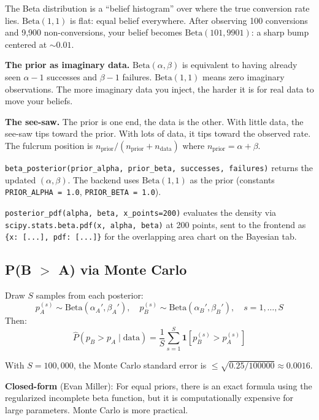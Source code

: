 \documentclass[11pt,a4paper]{article}
\newcommand{\code}[1]{\texttt{#1}}
\newcommand{\scipy}[1]{\texttt{scipy.stats.#1}}
\begin{document}
\vspace{8pt}

\begin{intuition}
The Beta distribution is a ``belief histogram'' over where the true conversion rate lies. $\mathrm{Beta}(1,1)$ is flat: equal belief everywhere. After observing 100 conversions and 9,900 non-conversions, your belief becomes $\mathrm{Beta}(101, 9901)$: a sharp bump centered at ${\sim}0.01$.

\medskip
\textbf{The prior as imaginary data.} $\mathrm{Beta}(\alpha, \beta)$ is equivalent to having already seen $\alpha - 1$ successes and $\beta - 1$ failures. $\mathrm{Beta}(1,1)$ means zero imaginary observations. The more imaginary data you inject, the harder it is for real data to move your beliefs.

\medskip
\textbf{The see-saw.} The prior is one end, the data is the other. With little data, the see-saw tips toward the prior. With lots of data, it tips toward the observed rate. The fulcrum position is $n_{\mathrm{prior}} / (n_{\mathrm{prior}} + n_{\mathrm{data}})$ where $n_{\mathrm{prior}} = \alpha + \beta$.
\end{intuition}

\vspace{8pt}

\begin{application}
\code{beta\_posterior(prior\_alpha, prior\_beta, successes, failures)} returns the updated $(\alpha, \beta)$. The backend uses $\mathrm{Beta}(1, 1)$ as the prior (constants \code{PRIOR\_ALPHA = 1.0}, \code{PRIOR\_BETA = 1.0}).

\code{posterior\_pdf(alpha, beta, x\_points=200)} evaluates the density via \scipy{beta.pdf(x, alpha, beta)} at 200 points, sent to the frontend as \code{\{x: [...], pdf: [...]\}} for the overlapping area chart on the Bayesian tab.
\end{application}

\subsection{P(B $>$ A) via Monte Carlo}

\begin{formaldef}
Draw $S$ samples from each posterior:
\[
p_A^{(s)} \sim \mathrm{Beta}(\alpha_A', \beta_A'), \quad p_B^{(s)} \sim \mathrm{Beta}(\alpha_B', \beta_B'), \quad s = 1, \ldots, S
\]
Then:
\[
\widehat{P}(p_B > p_A \mid \text{data}) = \frac{1}{S}\sum_{s=1}^{S} \mathbf{1}\!\left[p_B^{(s)} > p_A^{(s)}\right]
\]

With $S = 100{,}000$, the Monte Carlo standard error is $\leq \sqrt{0.25/100000} \approx 0.0016$.

\medskip
\textbf{Closed-form} (Evan Miller): For equal priors, there is an exact formula using the regularized incomplete beta function, but it is computationally expensive for large parameters. Monte Carlo is more practical.
\end{formaldef}
\end{document}
